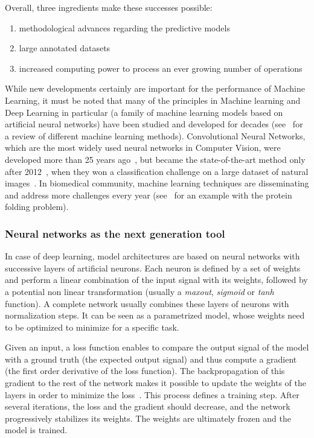 \noindent
Overall, three ingredients make these successes possible:
\begin{enumerate}
	\setlength\itemsep{0.1em}
	\item methodological advances regarding the predictive models
	\item large annotated datasets
	\item increased computing power to process an ever growing number of operations
\end{enumerate}

\noindent
While new developments certainly are important for the performance of Machine Learning, it must be noted that many of the principles in Machine learning and Deep Learning in particular (a family of machine learning models based on artificial neural networks) have been studied and developed for decades (see~\cite{Bishop_2006, hastie_elements_2009} for a review of different machine learning methods).
Convolutional Neural Networks, which are the most widely used neural networks in Computer Vision, were developed more than 25 years ago~\cite{LeCun1998}, but became the state-of-the-art method only after 2012~\cite{alexnet_2012}, when they won a classification challenge on a large dataset of natural images~\cite{Deng_2009}. 
In biomedical community, machine learning techniques are disseminating and address more challenges every year (see~\cite{jumper_highly_2021} for an example with the protein folding problem).

\subsubsection{Neural networks as the next generation tool}

In case of deep learning, model architectures are based on neural networks with successive layers of artificial neurons.
Each neuron is defined by a set of weights and perform a linear combination of the input signal with its weights, followed by a potential non linear transformation (usually a \emph{maxout}, \emph{sigmoid} or \emph{tanh} function).
A complete network usually combines these layers of neurons with normalization steps.
It can be seen as a parametrized model, whose weights need to be optimized to minimize for a specific task.

Given an input, a loss function enables to compare the output signal of the model with a ground truth (the expected output signal) and thus compute a gradient (the first order derivative of the loss function).
The backpropagation of this gradient to the rest of the network makes it possible to update the weights of the layers in order to minimize the loss~\cite{rumelhart_learning_1986}.
This process defines a training step.
After several iterations, the loss and the gradient should decrease, and the network progressively stabilizes its weights.
The weights are ultimately frozen and the model is trained.

